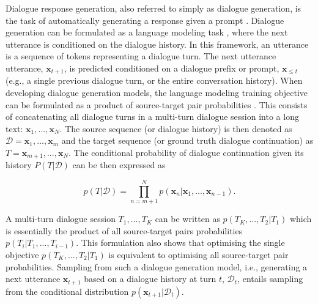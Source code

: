 Dialogue response generation, also referred to simply as dialogue generation, is the task of automatically generating a response given a prompt \citep{madotto-etal-2020-plug}. 
Dialogue generation can be formulated as a language modeling task \citep{welleck-etal-2019-dialogue}, where the next utterance is conditioned on the dialogue history.
In this framework, an utterance is a sequence of tokens representing a dialogue turn. The next utterance utterance, $\textbf{x}_{t + 1}$, is predicted conditioned on a dialogue prefix or prompt, $\textbf{x}_{\leq t}$ (e.g., a single previous dialogue turn, or the entire conversation history). 
When developing dialogue generation models, the language modeling training objective can be formulated as a product of source-target pair probabilities \citep{zhang2019dialogpt}. This consists of concatenating all dialogue turns in a multi-turn dialogue session into a long text: $\textbf{x}_1, ..., \textbf{x}_N$. The source sequence (or dialogue history) is then denoted as $\mathcal{D} = \textbf{x}_1, ..., \textbf{x}_m$ and the target sequence (or ground truth dialogue continuation) as $T = \textbf{x}_{m + 1}, ..., \textbf{x}_N$. The conditional probability of dialogue continuation given its history $P(T | \mathcal{D})$ can be then expressed as

\begin{equation}
    p(T | \mathcal{D}) = \prod_{n = m + 1}^N p(\textbf{x}_n | \textbf{x}_1, ..., \textbf{x}_{n - 1}).
\end{equation}

A multi-turn dialogue session $T_1, ..., T_K$ can be written as $p(T_K, ..., T_2 | T_1)$ which is essentially the product of all source-target pairs probabilities $p(T_i | T_1, ..., T_{i - 1})$. This formulation also shows that optimising the single objective $p(T_K, ..., T_2 | T_1)$ is equivalent to optimising all source-target pair probabilities. Sampling from such a dialogue generation model, i.e., generating a next utterance $\textbf{x}_{t + 1}$ based on a dialogue history at turn $t$, $\mathcal{D}_t$, entails sampling from the conditional distribution $p(\textbf{x}_{t + 1} | \mathcal{D}_t)$.

